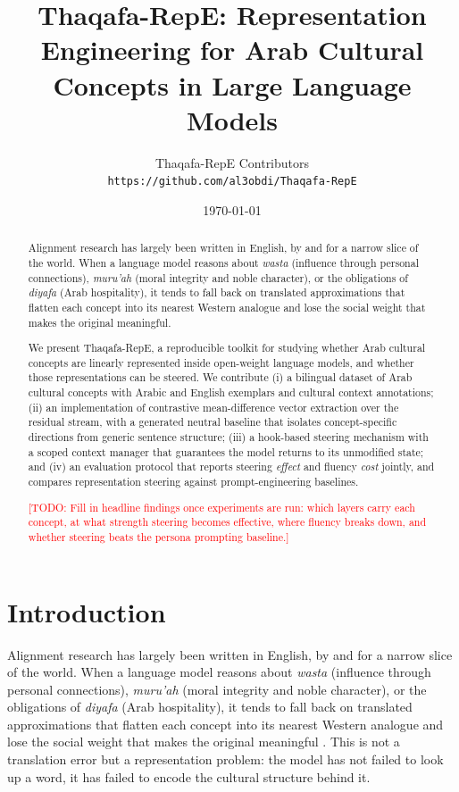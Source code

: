 \documentclass[11pt,a4paper]{article}
\title{Thaqafa-RepE: Representation Engineering for Arab Cultural Concepts
       in Large Language Models}
\author{
  Thaqafa-RepE Contributors \\
  \texttt{https://github.com/al3obdi/Thaqafa-RepE}
}
\date{\today}
\newcommand{\todo}[1]{\textcolor{red}{[TODO: #1]}}
\newcommand{\arabterm}[2]{\emph{#1} (#2)}
\begin{document}
\maketitle

\begin{abstract}
Alignment research has largely been written in English, by and for a narrow
slice of the world. When a language model reasons about
\arabterm{wasta}{influence through personal connections},
\arabterm{muru'ah}{moral integrity and noble character}, or the obligations of
\arabterm{diyafa}{Arab hospitality}, it tends to fall back on translated
approximations that flatten each concept into its nearest Western analogue and
lose the social weight that makes the original meaningful.

We present Thaqafa-RepE, a reproducible toolkit for studying whether Arab
cultural concepts are linearly represented inside open-weight language models,
and whether those representations can be steered. We contribute (i) a bilingual
dataset of Arab cultural concepts with Arabic and English exemplars and
cultural context annotations; (ii) an implementation of contrastive
mean-difference vector extraction over the residual stream, with a generated
neutral baseline that isolates concept-specific directions from generic
sentence structure; (iii) a hook-based steering mechanism with a scoped context
manager that guarantees the model returns to its unmodified state; and (iv) an
evaluation protocol that reports steering \emph{effect} and fluency \emph{cost}
jointly, and compares representation steering against prompt-engineering
baselines.

\todo{Fill in headline findings once experiments are run: which layers carry
each concept, at what strength steering becomes effective, where fluency breaks
down, and whether steering beats the persona prompting baseline.}
\end{abstract}

\section{Introduction}
\label{sec:introduction}

Alignment research has largely been written in English, by and for a narrow
slice of the world. When a language model reasons about
\arabterm{wasta}{influence through personal connections},
\arabterm{muru'ah}{moral integrity and noble character}, or the obligations of
\arabterm{diyafa}{Arab hospitality}, it tends to fall back on translated
approximations that flatten each concept into its nearest Western analogue
and lose the social weight that makes the original meaningful
\citep{naous2024having}. This is not a translation error but a representation
problem: the model has not failed to look up a word, it has failed to encode
the cultural structure behind it.
\end{document}
